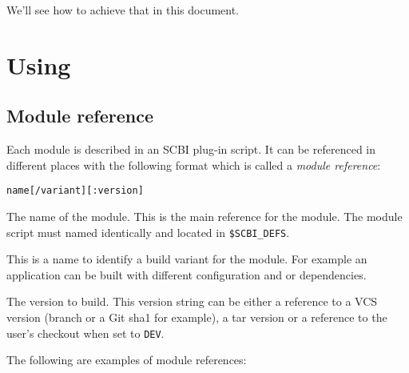 \documentclass[a4paper,12pt,twoside]{article}
\newcommand{\code}[1]{\texttt{#1}}
\renewcommand{\emph}[1]{\textit{#1}}
\let\stdsection\section
\renewcommand\section{\newpage\stdsection}
\begin{document}
We'll see how to achieve that in this document.


\section{Using}

\subsection{Module reference}
\label{modref}

Each module is described in an SCBI plug-in script. It can be referenced in different places with the following format which is called a \emph{module reference}:

\code{name[/variant][:version]}
\label{dev}

\begin{description}[style=nextline]
	\item[name] The name of the module. This is the main reference for the module. The module script must named identically and located in \code{\$SCBI\_DEFS}.

	\item[variant] \label{variant}This is a name to identify a build variant for the module. For example an application can be built with different configuration and or dependencies.

	\item[version] The version to build. This version string can be either a reference to a VCS version (branch or a Git sha1 for example), a tar version or a reference to the user's checkout when set to \code{DEV}.
\end{description}

The following are examples of module references:
\end{document}
